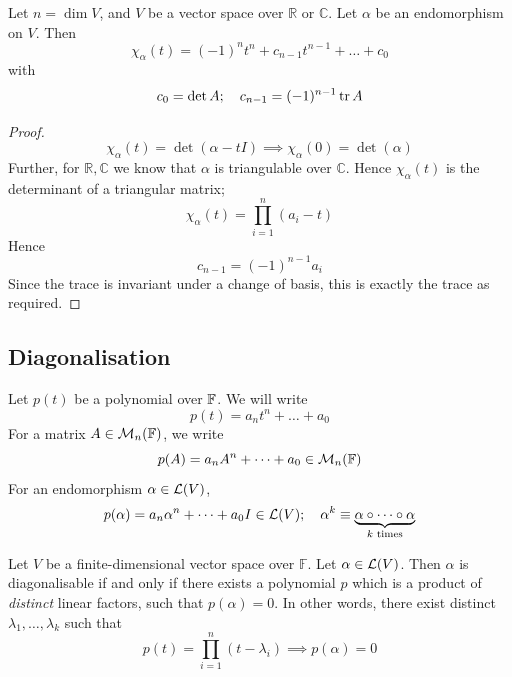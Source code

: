 \documentclass[a4paper]{article}
\begin{document}
\begin{lemma}
	Let $ n = \dim V $, and $ V $ be a vector space over $ \mathbb R $ or $ \mathbb C $.
	Let $ \alpha $ be an endomorphism on $ V $.
	Then
	\[
		\chi_\alpha(t) = (-1)^n t^n + c_{n-1} t^{n-1} + \dots + c_0
	\]
	with
	\[
		c_0 = \det A;\quad c_{n-1} = (-1)^{n-1} \tr A
	\]
\end{lemma}
\begin{proof}
	\[
		\chi_\alpha(t) = \det(\alpha - t I) \implies \chi_\alpha(0) = \det(\alpha)
	\]
	Further, for $ \mathbb R, \mathbb C $ we know that $ \alpha $ is triangulable over $ \mathbb C $.
	Hence $ \chi_\alpha(t) $ is the determinant of a triangular matrix;
	\[
		\chi_\alpha(t) = \prod_{i=1}^n (a_i - t)
	\]
	Hence
	\[
		c_{n-1} = (-1)^{n-1} a_i
	\]
	Since the trace is invariant under a change of basis, this is exactly the trace as required.
\end{proof}


\subsection{Diagonalisation}
Let $ p(t) $ be a polynomial over $ {\mathbb{F}} $.
We will write
\[
	p(t) = a_n t^n + \dots + a_0
\]
For a matrix $ A \in {\mathcal{M}}_n({\mathbb{F}}) $, we write
\[
	p(A) = a_n A^n + \dots + a_0 \in {\mathcal{M}}_n({\mathbb{F}})
\]
For an endomorphism $ \alpha \in {\mathcal{L}}(V) $,
\[
	p(\alpha) = a_n \alpha^n + \dots + a_0 I \in {\mathcal{L}}(V);\quad \alpha^k \equiv \underbrace{\alpha \circ \dots \circ \alpha}_{k \text{ times}}
\]

\begin{theorem}
	Let $V$ be a finite-dimensional vector space over $\mathbb{F}$. Let $\alpha\in {\mathcal{L}}(V)$. Then $\alpha$ is diagonalisable if and only if there exists a polynomial $ p $ which is a product of \textit{distinct} linear factors, such that $ p(\alpha) = 0 $.
	In other words, there exist distinct $ \lambda_1, \dots, \lambda_k $ such that
	\[
		p(t) = \prod_{i=1}^n (t - \lambda_i) \implies p(\alpha) = 0
	\]
\end{theorem}
\end{document}
